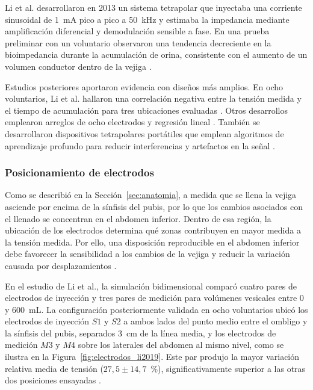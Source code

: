 \documentclass[12pt,a4paper]{article}
\begin{document}
Li et al. desarrollaron en 2013 un sistema tetrapolar que inyectaba una corriente sinusoidal de
1~mA pico a pico a 50~kHz y estimaba la impedancia mediante amplificación diferencial y demodulación
sensible a fase. En una prueba preliminar con un voluntario observaron una tendencia decreciente en la
bioimpedancia durante la acumulación de orina, consistente con el aumento de un volumen conductor
dentro de la vejiga \cite{li2013monitoring}.

Estudios posteriores aportaron evidencia con diseños más amplios. En ocho voluntarios, Li et al.
hallaron una correlación negativa entre la tensión medida y el tiempo de acumulación para tres
ubicaciones evaluadas \cite{li2019electrode}. Otros desarrollos emplearon arreglos de ocho electrodos
y regresión lineal \cite{noyori2021device}. También se desarrollaron dispositivos tetrapolares
portátiles que emplean algoritmos de aprendizaje profundo para reducir interferencias y artefactos en
la señal \cite{dheman2023bladder}.



\subsubsection{Posicionamiento de electrodos}

Como se describió en la Sección~\ref{sec:anatomia}, a medida que se llena la vejiga asciende por
encima de la sínfisis del pubis, por lo que los cambios asociados con el llenado se concentran en el
abdomen inferior. Dentro de esa región, la ubicación de los electrodos determina qué zonas contribuyen
en mayor medida a la tensión medida.
Por ello, una disposición reproducible en el abdomen inferior debe favorecer la sensibilidad a los
cambios de la vejiga y reducir la variación causada por desplazamientos \cite{li2019electrode}.

En el estudio de Li et al., la simulación bidimensional comparó cuatro pares de electrodos de inyección
y tres pares de medición para volúmenes vesicales entre 0 y 600~mL. La configuración posteriormente
validada en ocho voluntarios ubicó los electrodos de inyección $S1$ y $S2$ a ambos lados del punto medio
entre el ombligo y la sínfisis del pubis, separados 3~cm de la línea media, y los electrodos de medición
$M3$ y $M4$ sobre los laterales del abdomen al mismo nivel, como se ilustra en la
Figura~\ref{fig:electrodos_li2019}. Este par produjo la mayor variación relativa media de tensión
($27{,}5\pm14{,}7$~\%), significativamente superior a las otras dos posiciones ensayadas
\cite{li2019electrode}.
\end{document}
